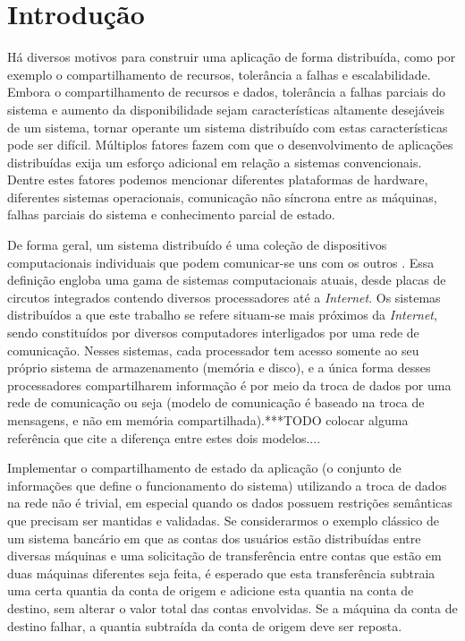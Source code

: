 \documentclass[11pt,twoside,a4paper]{book}
\begin{document}
\listoffigures
\listoftables
\listofalgorithms

\mainmatter

\fancyhead[RE,LO]{\thesection}

\singlespacing              %

\chapter{Introdução}
\label{chap:introducao}
Há diversos motivos para construir uma aplicação de forma distribuída, como por exemplo o compartilhamento de recursos, tolerância a falhas e escalabilidade. Embora o compartilhamento de recursos e dados, tolerância a falhas parciais do sistema e aumento da disponibilidade sejam características altamente desejáveis de um sistema, tornar operante um sistema distribuído com estas características pode ser difícil. Múltiplos fatores fazem com que o desenvolvimento de aplicações distribuídas exija um esforço adicional em relação a sistemas convencionais. Dentre estes fatores podemos mencionar diferentes plataformas de hardware, diferentes sistemas operacionais, comunicação não síncrona entre as máquinas, falhas parciais do sistema e conhecimento parcial de estado.

De forma geral, um sistema distribuído é uma coleção de dispositivos computacionais individuais que podem comunicar-se uns com os outros \cite{tanenbaum, distributed_computing}. Essa definição engloba uma gama de sistemas computacionais atuais, desde placas de circutos integrados contendo diversos processadores até a \emph{Internet}. Os sistemas distribuídos a que este trabalho se refere situam-se mais próximos da \emph{Internet}, sendo constituídos por diversos computadores interligados por uma rede de comunicação. Nesses sistemas, cada processador tem acesso somente ao seu próprio sistema de armazenamento (memória e disco), e a única forma desses processadores compartilharem informação é por meio da troca de dados por uma rede de comunicação ou seja (modelo de comunicação é baseado na troca de mensagens, e não em memória compartilhada).***TODO colocar alguma referência que cite a diferença entre estes dois modelos....

Implementar o compartilhamento de estado da aplicação (o conjunto de informações que define o funcionamento do sistema) utilizando a troca de dados na rede não é trivial, em especial quando os dados possuem restrições semânticas que precisam ser mantidas e validadas. Se considerarmos o exemplo clássico de um sistema bancário em que as contas dos usuários estão distribuídas entre diversas máquinas e uma solicitação de transferência entre contas que estão em duas máquinas diferentes seja feita, é esperado que esta transferência subtraia uma certa quantia da conta de origem e adicione esta quantia na conta de destino, sem alterar o valor total das contas envolvidas. Se a máquina da conta de destino falhar, a quantia subtraída da conta de origem deve ser reposta.
\end{document}
